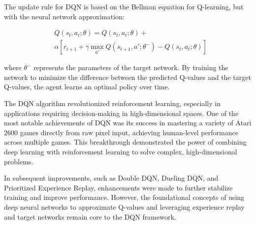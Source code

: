 The update rule for DQN is based on the Bellman equation for Q-learning, but
with the neural network approximation:

\begin{equation}
    \begin{split}
        &Q(s_t, a_t; \theta) = Q(s_t, a_t; \theta) + \\
         & \alpha \left[ r_{t+1} + \gamma \max_{a'} Q(s_{t+1}, a'; \theta^-) - Q(s_t, a_t; \theta) \right] 
    \end{split}
\end{equation}

where \( \theta^- \) represents the parameters of the target network. By
training the network to minimize the difference between the predicted Q-values
and the target Q-values, the agent learns an optimal policy over
time.\cite{bg4}

The DQN algorithm revolutionized reinforcement learning, especially in
applications requiring decision-making in high-dimensional spaces. One of the
most notable achievements of DQN was its success in mastering a variety of
Atari 2600 games directly from raw pixel input, achieving human-level
performance across multiple games. This breakthrough demonstrated the power of
combining deep learning with reinforcement learning to solve complex,
high-dimensional problems.

In subsequent improvements, such as Double DQN, Dueling DQN, and Prioritized
Experience Replay, enhancements were made to further stabilize training and
improve performance. However, the foundational concepts of using deep neural
networks to approximate Q-values and leveraging experience replay and target
networks remain core to the DQN framework.
